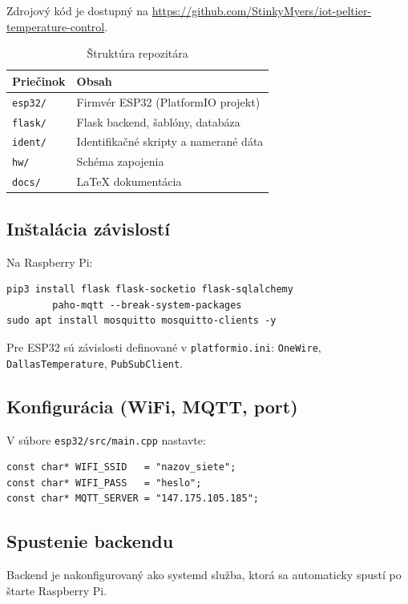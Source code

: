 Zdrojový kód je dostupný na \url{https://github.com/StinkyMyers/iot-peltier-temperature-control}.

\begin{table}[H]
\centering
\renewcommand{\arraystretch}{1.3}
\begin{tabular}{|l|l|}
\hline
\textbf{Priečinok} & \textbf{Obsah} \\
\hline
\texttt{esp32/} & Firmvér ESP32 (PlatformIO projekt) \\
\texttt{flask/} & Flask backend, šablóny, databáza \\
\texttt{ident/} & Identifikačné skripty a namerané dáta \\
\texttt{hw/}    & Schéma zapojenia \\
\texttt{docs/}  & LaTeX dokumentácia \\
\hline
\end{tabular}
\caption{Štruktúra repozitára}
\end{table}

\subsection{Inštalácia závislostí}

Na Raspberry Pi:
\begin{verbatim}
pip3 install flask flask-socketio flask-sqlalchemy
        paho-mqtt --break-system-packages
sudo apt install mosquitto mosquitto-clients -y
\end{verbatim}

Pre ESP32 sú závislosti definované v \texttt{platformio.ini}:
\texttt{OneWire}, \texttt{DallasTemperature}, \texttt{PubSubClient}.

\subsection{Konfigurácia (WiFi, MQTT, port)}

V súbore \texttt{esp32/src/main.cpp} nastavte:
\begin{verbatim}
const char* WIFI_SSID   = "nazov_siete";
const char* WIFI_PASS   = "heslo";
const char* MQTT_SERVER = "147.175.105.185";
\end{verbatim}

\subsection{Spustenie backendu}

Backend je nakonfigurovaný ako systemd služba, ktorá sa automaticky spustí po štarte Raspberry Pi.

